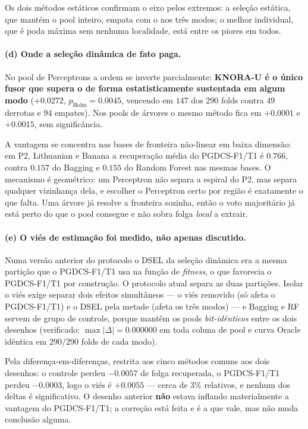 Os dois métodos estáticos confirmam o eixo pelos extremos: a seleção estática, que
mantém o pool inteiro, empata com o \mvr{} nos três modos; o melhor individual, que
é poda máxima sem nenhuma localidade, está entre os piores em todos.

\paragraph{(d) Onde a seleção dinâmica de fato paga.}
No pool de Perceptrons a ordem se inverte parcialmente: \textbf{KNORA-U é o único
fusor que supera o \mvr{} de forma estatisticamente sustentada em algum modo}
($+0.0272$, $p_{\text{Holm}}=0.0045$, vencendo em $147$ dos $290$ folds contra $49$
derrotas e $94$ empates). Nos pools de árvores o mesmo método fica em $+0.0001$ e
$+0.0015$, sem significância.

A vantagem se concentra nas bases de fronteira não-linear em baixa dimensão: em P2,
Lithuanian e Banana a recuperação média do PGDCS-F1/T1 é $0.766$, contra $0.157$ do Bagging e
$0.155$ do Random Forest nas mesmas bases. O mecanismo é geométrico: um Perceptron
não separa a espiral do P2, mas separa qualquer vizinhança dela, e escolher o
Perceptron certo por região é exatamente o que falta. Uma árvore já resolve a
fronteira sozinha, então o voto majoritário já está perto do que o pool consegue e
não sobra folga \emph{local} a extrair.

\paragraph{(e) O viés de estimação foi medido, não apenas discutido.}
Numa versão anterior do protocolo o DSEL da seleção dinâmica era a mesma partição
que o PGDCS-F1/T1 usa na função de \emph{fitness}, o que favorecia o PGDCS-F1/T1 por construção. O
protocolo atual separa as duas partições. Isolar o viés exige separar dois efeitos
simultâneos --- o viés removido (só afeta o PGDCS-F1/T1) e o DSEL pela metade (afeta os três
modos) --- e Bagging e RF servem de grupo de controle, porque mantêm os pools
\emph{bit-idênticos} entre os dois desenhos (verificado: $\max|\Delta| = 0.000000$
em toda coluna de pool e curva Oracle idêntica em $290/290$ folds de cada modo).

Pela diferença-em-diferenças, restrita aos cinco métodos comuns aos dois desenhos: o
controle perdeu $-0.0057$ de folga recuperada, o PGDCS-F1/T1 perdeu $-0.0003$, logo o viés é
$+0.0055$ --- cerca de $3\%$ relativos, e nenhum dos deltas é significativo. O
desenho anterior \textbf{não} estava inflando materialmente a vantagem do PGDCS-F1/T1; a
correção está feita e é a que vale, mas não muda conclusão alguma.

